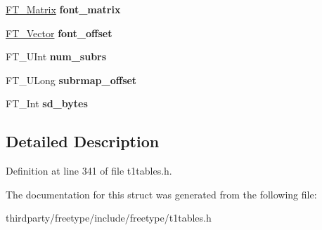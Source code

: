\begin{DoxyCompactItemize}
\hyperlink{struct_f_t___matrix__}{F\+T\+\_\+\+Matrix} {\bfseries font\+\_\+matrix}
\item 
\mbox{\label{struct_c_i_d___face_dict_rec___aa62daa8d45ed4a817f1207cbd452d61e}} 
\hyperlink{struct_f_t___vector__}{F\+T\+\_\+\+Vector} {\bfseries font\+\_\+offset}
\item 
\mbox{\label{struct_c_i_d___face_dict_rec___a611c406c8d7cd2e37d077070f4bb3ebe}} 
F\+T\+\_\+\+U\+Int {\bfseries num\+\_\+subrs}
\item 
\mbox{\label{struct_c_i_d___face_dict_rec___a45d58111727af70018289e7c5b64ba8c}} 
F\+T\+\_\+\+U\+Long {\bfseries subrmap\+\_\+offset}
\item 
\mbox{\label{struct_c_i_d___face_dict_rec___aecdf98f9671f22c1715ec929b77767ce}} 
F\+T\+\_\+\+Int {\bfseries sd\+\_\+bytes}
\end{DoxyCompactItemize}


\subsection{Detailed Description}


Definition at line 341 of file t1tables.\+h.



The documentation for this struct was generated from the following file\+:\begin{DoxyCompactItemize}
\item 
thirdparty/freetype/include/freetype/t1tables.\+h\end{DoxyCompactItemize}
